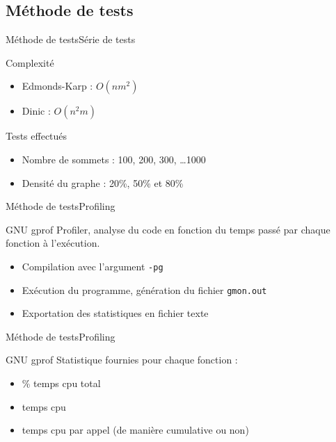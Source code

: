 \subsection{Méthode de tests}
\begin{frame}{Méthode de tests}{Série de tests}
\begin{block}{Complexité}
  \begin{itemize}
    \item Edmonds-Karp : $O(nm^2)$
    \item Dinic : $O(n^2m)$
  \end{itemize}
\end{block}
\begin{block}{Tests effectués}
  \begin{itemize}
    \item Nombre de sommets : 100, 200, 300, \ldots 1000
    \item Densité du graphe : 20\%, 50\% et 80\%
  \end{itemize}
\end{block}
\end{frame}

\begin{frame}{Méthode de tests}{Profiling}
\begin{block}{GNU gprof}
Profiler, analyse du code en fonction du temps passé par chaque fonction à l’exécution.
\begin{itemize}
\item Compilation avec l'argument \texttt{-pg}
\item Exécution du programme, génération du fichier \texttt{gmon.out}
\item Exportation des statistiques en fichier texte
\end{itemize}
\end{block}
\end{frame}

\begin{frame}{Méthode de tests}{Profiling}
\begin{block}{GNU gprof}
Statistique fournies pour chaque fonction :
\begin{itemize}
\item \% temps cpu total
\item temps cpu
\item temps cpu par appel (de manière cumulative ou non)
\end{itemize}
\end{block}
\end{frame}

